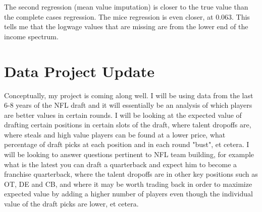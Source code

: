 \documentclass{article}
\begin{document}
The second regression (mean value imputation) is closer to the true value than the complete cases regression. The mice regression is even closer, at 0.063. This tells me that the logwage values that are missing are from the lower end of the income spectrum. 













\section{Data Project Update}

Conceptually, my project is coming along well. I will be using data from the last 6-8 years of the NFL draft and it will essentially be an analysis of which players are better values in certain rounds. I will be looking at the expected value of drafting certain positions in certain slots of the draft, where talent dropoffs are, where steals and high value players can be found at a lower price, what percentage of draft picks at each position and in each round "bust", et cetera. I will be looking to answer questions pertinent to NFL team building, for example what is the latest you can draft a quarterback and expect him to become a franchise quarterback, where the talent dropoffs are in other key positions such as OT, DE and CB, and where it may be worth trading back in order to maximize expected value by adding a higher number of players even though the individual value of the draft picks are lower, et cetera.
\end{document}
